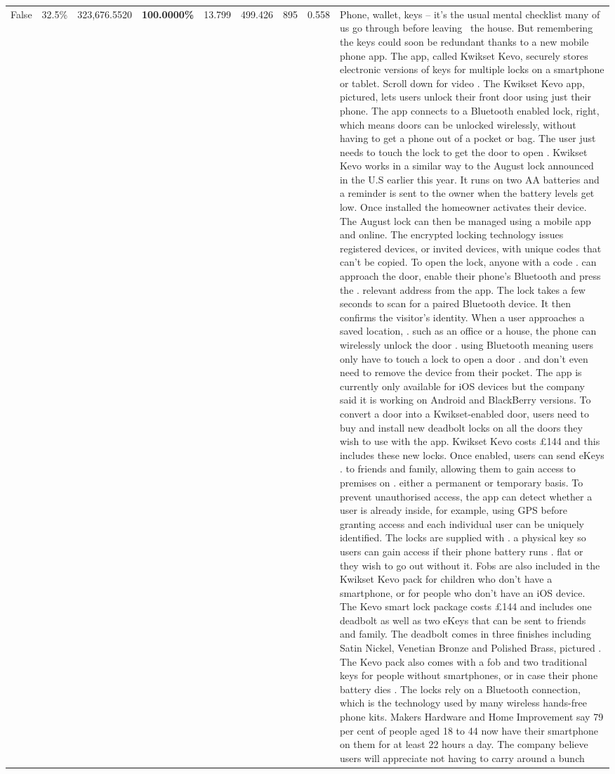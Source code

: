 \begin{table}[H]
\begin{tabular}{lllrlllll}
False & 32.5\% & 323,676.5520 & \bfseries \color{red} 100.0000\% & 13.799 & 499.426 & 895 & 0.558 & Phone, wallet, keys – it’s the usual mental checklist many of us go through before leaving  the house. But remembering the keys could soon be redundant thanks to a new mobile phone app. The app, called Kwikset Kevo, securely stores electronic versions of keys for multiple locks on a smartphone or tablet. Scroll down for video . The Kwikset Kevo app, pictured, lets users unlock their front door using just their phone. The app connects to a Bluetooth enabled lock, right, which means doors can be unlocked wirelessly, without having to get a phone out of a pocket or bag. The user just needs to touch the lock to get the door to open . Kwikset Kevo works in a similar way to the August lock announced in the U.S earlier this year. It runs on two AA batteries and a reminder is sent to the owner when the battery levels get low. Once installed the homeowner activates their device. The August lock can then be managed using a mobile app and online. The encrypted locking technology issues registered devices, or invited devices, with unique codes that can't be copied. To open the lock, anyone with a code . can approach the door, enable their phone's Bluetooth and press the . relevant address from the app. The lock takes a few seconds to scan for a paired Bluetooth device. It then confirms the visitor's identity. When a user approaches a saved location, . such as an office or a house, the phone can wirelessly unlock the door . using Bluetooth meaning users only have to touch a lock to open a door . and don't even need to remove the device from their pocket. The app is currently only available for iOS devices but the company said it is working on Android and BlackBerry versions. To convert a door into a Kwikset-enabled door, users need to buy and install new deadbolt locks on all the doors they wish to use with the app. Kwikset Kevo costs £144 and this includes these new locks. Once enabled, users can send eKeys . to friends and family, allowing them to gain access to premises on . either a permanent or temporary basis. To prevent unauthorised access, the app can detect whether a user is already inside, for example, using GPS before granting access and each individual user can be uniquely identified. The locks are supplied with . a physical key so users can gain access if their phone battery runs . flat or they wish to go out without it. Fobs are also included in the Kwikset Kevo pack for children who don't have a smartphone, or for people who don't have an iOS device. The Kevo smart lock package costs £144 and includes one deadbolt as well as two eKeys that can be sent to friends and family. The deadbolt comes in three finishes including Satin Nickel, Venetian Bronze and Polished Brass, pictured . The Kevo pack also comes with a fob and two traditional keys for people without smartphones, or in case their phone battery dies . The locks rely on a Bluetooth connection, which is the technology used by many wireless hands-free phone kits. Makers Hardware and Home Improvement say 79 per cent of people aged 18 to 44 now have their smartphone on them for at least 22 hours a day. The company believe users will appreciate not having to carry around a bunch 
\end{tabular}
\end{table}
